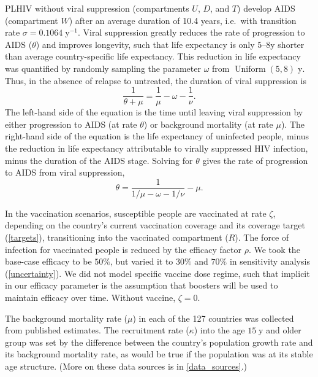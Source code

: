 \documentclass{article}
\DeclareMathOperator{\Uniform}{Uniform}
\begin{document}
PLHIV without viral suppression (compartments $U$, $D$, and $T$)
develop AIDS (compartment $W$) after an average duration of 10.4
years,\cite{Morgan2002-cq} i.e.~with transition rate
$\sigma = 0.1064\;\text{y$^{-1}$}$.  Viral suppression greatly reduces
the rate of progression to AIDS ($\theta$) and improves longevity,
such that life expectancy is only $5$--$8$\;y shorter than average
country-specific life expectancy.\cite{Samji2013-kf, Unaids2014-ue}
This reduction in life expectancy was quantified by randomly sampling
the parameter $\omega$ from $\Uniform(5, 8)\;\text{y}$. Thus, in the
absence of relapse to untreated, the duration of viral suppression is
\begin{equation}
  \frac{1}{\theta + \mu} = \frac{1}{\mu} - \omega - \frac{1}{\nu}.
\end{equation}
The left-hand side of the equation is the time until leaving viral
suppression by either progression to AIDS (at rate $\theta$) or
background mortality (at rate $\mu$).  The right-hand side of the
equation is the life expectancy of uninfected people, minus the
reduction in life expectancy attributable to virally suppressed HIV
infection, minus the duration of the AIDS stage.  Solving for $\theta$
gives the rate of progression to AIDS from viral suppression,
\begin{equation}
  \label{theta}
  \theta = \frac{1}{1/\mu - \omega - 1/\nu} - \mu.
\end{equation}

In the vaccination scenarios, susceptible people are vaccinated at
rate $\zeta$, depending on the country's current vaccination coverage
and its coverage target (\autoref{targets}), transitioning into the
vaccinated compartment ($R$).  The force of infection for vaccinated
people is reduced by the efficacy factor $\rho$.  We took the
base-case efficacy to be $50\%$, but varied it to $30\%$ and $70\%$ in
sensitivity analysis (\autoref{uncertainty}).  We did not model
specific vaccine dose regime, such that implicit in our efficacy
parameter is the assumption that boosters will be used to maintain
efficacy over time.  Without vaccine, $\zeta = 0$.

The background mortality rate ($\mu$) in each of the 127 countries was
collected from published
estimates.\cite{World_Development_Indicators2013-ee} The recruitment
rate ($\kappa$) into the age $15\;\text{y}$ and older group was set by
the difference between the country's population growth
rate\cite{WorldBankpg} and its background mortality
rate,\cite{World_Development_Indicators2013-ee} as would be true if
the population was at its stable age structure.  (More on these data
sources is in \autoref{data_sources}.)
\end{document}
